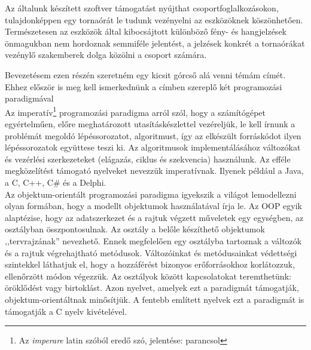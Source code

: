\documentclass[tocnopagenum]{thesis-ekf}
\begin{document}
	Az általunk készített szoftver támogatást nyújthat csoportfoglalkozásokon, tulajdonképpen egy tornaórát le tudunk vezényelni az eszközöknek köszönhetően. Természetesen az eszközök által kibocsájtott különböző fény- és hangjelzések önmagukban nem hordoznak semmiféle jelentést, a jelzések konkrét  a tornaórákat vezénylő szakemberek dolga közölni a csoport számára.
	
	Bevezetésem ezen részén szeretném egy kicsit górcső alá venni témám címét. Ehhez először is meg kell ismerkednünk a címben szereplő két programozási paradigmával\\
	Az imperatív\footnote{Az \textit{imperare} latin szóból eredő szó, jelentése: parancsol} programozási paradigma arról szól, hogy a számítógépet egyértelműen, előre meghatározott utasításkészlettel vezéreljük, le kell írnunk a problémát megoldó lépéssorozatot, algoritmust, így az elkészült forráskódot ilyen lépéssorozatok együttese teszi ki. Az algoritmusok implementálásához változókat és vezérlési szerkezeteket (elágazás, ciklus és szekvencia) használunk. Az efféle megközelítést támogató nyelveket nevezzük imperatívnak. Ilyenek például a Java, a C, C++, C\# és a Delphi.
	\\
	Az objektum-orientált programozási paradigma igyekszik a világot lemodellezni olyan formában, hogy a modellt objektumok használatával írja le. Az OOP egyik alaptézise, hogy az adatszerkezet és a rajtuk végzett műveletek egy egységben, az osztályban összpontosulnak. Az osztály a belőle készíthető objektumok ,,tervrajzának'' nevezhető. Ennek megfelelően egy osztályba tartoznak a változók és a rajtuk végrehajtható metódusok. Változóinkat és metódusainkat védettségi szintekkel láthatjuk el, hogy a hozzáférést bizonyos erőforrásokhoz korlátozzuk, ellenőrzött módon végezzük. Az osztályok között kapcsolatokat teremthetünk: öröklődést vagy birtoklást. Azon nyelvet, amelyek ezt a paradigmát támogatják, objektum-orientáltnak minősítjük.
	A fentebb említett nyelvek ezt a paradigmát is támogatják a C nyelv kivételével.
\end{document}
